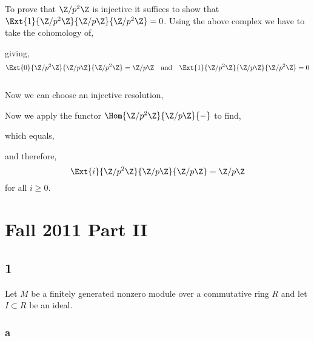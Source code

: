 \documentclass[12pt]{article}
\begin{document}
To prove that $\Z / p^2 \Z$ is injective it suffices to show that $\Ext{1}{\Z / p^2 \Z}{\Z / p \Z}{\Z / p^2 \Z} = 0$. Using the above complex we have to take the cohomology of,
\begin{center}
\end{center}
giving,
\[ \Ext{0}{\Z / p^2 \Z}{\Z / p \Z}{\Z / p^2 \Z} = \Z / p \Z \quad \text{and} \quad \Ext{1}{\Z / p^2 \Z}{\Z / p \Z}{\Z / p^2 \Z} = 0 \]
\bigskip\\
Now we can choose an injective resolution,
\begin{center}
\end{center}
Now we apply the functor $\Hom{\Z/p^2 \Z}{\Z / p \Z}{-}$ to find,
\begin{center}
\end{center}
which equals,
\begin{center}
\end{center}
and therefore,
\[ \Ext{i}{\Z / p^2 \Z}{\Z / p \Z}{\Z / p \Z} = \Z / p \Z \]
for all $i \ge 0$.

\section{Fall 2011 Part II}

\subsection{1}

Let $M$ be a finitely generated nonzero module over a commutative ring $R$ and let $I \subset R$ be an ideal.

\subsubsection{a}
\end{document}
